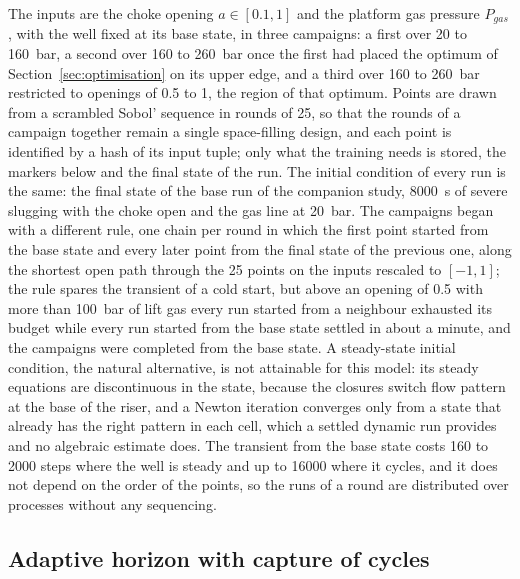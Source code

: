 \documentclass[a4paper,fleqn]{cas-sc}
\begin{document}
The inputs are the choke opening $a \in [0.1, 1]$ and the platform gas pressure $P_{gas}$, with the well fixed at its base state, in three campaigns: a first over 20 to \SI{160}{\bar}, a second over 160 to \SI{260}{\bar} once the first had placed the optimum of Section~\ref{sec:optimisation} on its upper edge, and a third over 160 to \SI{260}{\bar} restricted to openings of 0.5 to 1, the region of that optimum. Points are drawn from a scrambled Sobol' sequence \citep{sobol1967,owen1998} in rounds of 25, so that the rounds of a campaign together remain a single space-filling design, and each point is identified by a hash of its input tuple; only what the training needs is stored, the markers below and the final state of the run. The initial condition of every run is the same: the final state of the base run of the companion study, \SI{8000}{\second} of severe slugging with the choke open and the gas line at \SI{20}{\bar}. The campaigns began with a different rule, one chain per round in which the first point started from the base state and every later point from the final state of the previous one, along the shortest open path through the 25 points on the inputs rescaled to $[-1, 1]$; the rule spares the transient of a cold start, but above an opening of 0.5 with more than \SI{100}{\bar} of lift gas every run started from a neighbour exhausted its budget while every run started from the base state settled in about a minute, and the campaigns were completed from the base state. A steady-state initial condition, the natural alternative, is not attainable for this model: its steady equations are discontinuous in the state, because the closures switch flow pattern at the base of the riser, and a Newton iteration converges only from a state that already has the right pattern in each cell, which a settled dynamic run provides and no algebraic estimate does. The transient from the base state costs 160 to 2000 steps where the well is steady and up to 16000 where it cycles, and it does not depend on the order of the points, so the runs of a round are distributed over processes without any sequencing.

\subsection{Adaptive horizon with capture of cycles}\label{sec:horizon}
\end{document}
